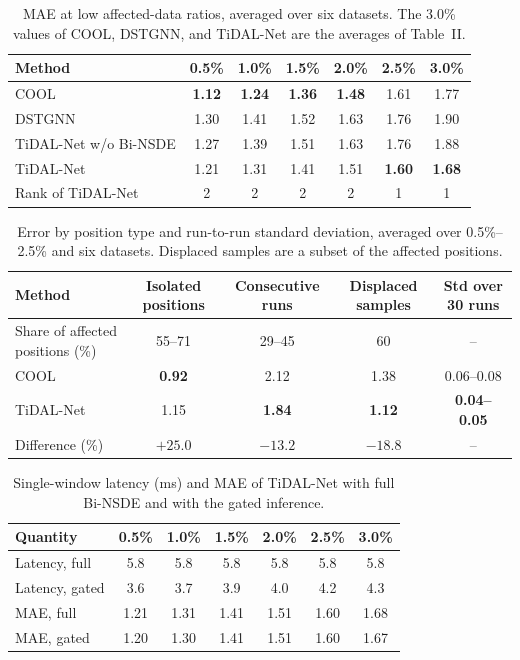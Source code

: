 \documentclass[10pt,a4paper]{article}
\begin{document}
\begin{table}[!htbp]
\centering
\caption{MAE at low affected-data ratios, averaged over six datasets. The 3.0\% values of COOL, DSTGNN, and TiDAL-Net are the averages of Table~II.}
\label{tab:s4}
\small
\begin{tabular}{lcccccc}
\toprule
Method & 0.5\% & 1.0\% & 1.5\% & 2.0\% & 2.5\% & 3.0\% \\
\midrule
COOL & \textbf{1.12} & \textbf{1.24} & \textbf{1.36} & \textbf{1.48} & 1.61 & 1.77 \\
DSTGNN & 1.30 & 1.41 & 1.52 & 1.63 & 1.76 & 1.90 \\
TiDAL-Net w/o Bi-NSDE & 1.27 & 1.39 & 1.51 & 1.63 & 1.76 & 1.88 \\
TiDAL-Net & 1.21 & 1.31 & 1.41 & 1.51 & \textbf{1.60} & \textbf{1.68} \\
\midrule
Rank of TiDAL-Net & 2 & 2 & 2 & 2 & 1 & 1 \\
\bottomrule
\end{tabular}
\end{table}

\begin{table}[!htbp]
\centering
\caption{Error by position type and run-to-run standard deviation, averaged over 0.5\%--2.5\% and six datasets. Displaced samples are a subset of the affected positions.}
\label{tab:s5}
\small
\begin{tabular}{lcccc}
\toprule
Method & Isolated positions & Consecutive runs & Displaced samples & Std over 30 runs \\
\midrule
Share of affected positions (\%) & 55--71 & 29--45 & 60 & -- \\
COOL & \textbf{0.92} & 2.12 & 1.38 & 0.06--0.08 \\
TiDAL-Net & 1.15 & \textbf{1.84} & \textbf{1.12} & \textbf{0.04--0.05} \\
Difference (\%) & $+25.0$ & $-13.2$ & $-18.8$ & -- \\
\bottomrule
\end{tabular}
\end{table}

\begin{table}[!htbp]
\centering
\caption{Single-window latency (ms) and MAE of TiDAL-Net with full Bi-NSDE and with the gated inference.}
\label{tab:s6}
\small
\begin{tabular}{lcccccc}
\toprule
Quantity & 0.5\% & 1.0\% & 1.5\% & 2.0\% & 2.5\% & 3.0\% \\
\midrule
Latency, full & 5.8 & 5.8 & 5.8 & 5.8 & 5.8 & 5.8 \\
Latency, gated & 3.6 & 3.7 & 3.9 & 4.0 & 4.2 & 4.3 \\
MAE, full & 1.21 & 1.31 & 1.41 & 1.51 & 1.60 & 1.68 \\
MAE, gated & 1.20 & 1.30 & 1.41 & 1.51 & 1.60 & 1.67 \\
\bottomrule
\end{tabular}
\end{table}
\end{document}
